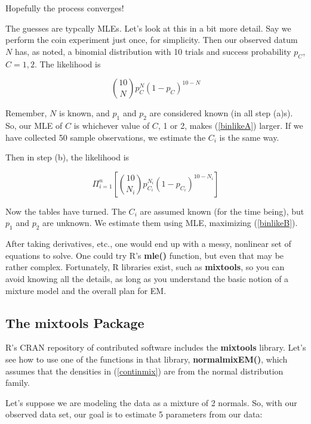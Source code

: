 Hopefully the process converges!

The guesses are typcally MLEs.  Let's look at this in a bit more detail.
Say we perform the coin experiment just once, for simplicity.  Then our
observed datum $N$ has, as noted, a binomial distribution with 10 trials
and success probability $p_C$, $C = 1,2$.  The likelihood is

\begin{equation}
\label{binlikeA}
\binom{10}{N} p_C^N (1-p_C)^{10-N}
\end{equation}

Remember, $N$ is known, and $p_1$ and $p_2$ are considered known (in all
step (a)s).  So, our MLE of $C$ is whichever value of $C$, 1 or 2, makes
(\ref{binlikeA}) larger.  If we have collected 50 sample observations, we
estimate the $C_i$ is the same way.

Then in step (b), the likelihood is

\begin{equation}
\label{binlikeB}
\Pi_{i=1}^n
\left [ \binom{10}{N_i} p_{C_i}^{N_i} (1-p_{C_i})^{10-N_i} 
\right ]
\end{equation}

Now the tables have turned.  The $C_i$ are assumed known (for the time
being), but $p_1$ and $p_2$ are unknown.  We estimate them using MLE,
maximizing (\ref{binlikeB}).

After taking derivatives, etc., one would end up with a messy, nonlinear
set of equations to solve.  One could try R's {\bf mle()} function, but
even that may be rather complex.  Fortunately, R libraries exist, such
as {\bf mixtools}, so you can avoid knowing all the details, as long as
you understand the basic notion of a mixture model and the overall plan
for EM.  

\subsection{The mixtools Package}

R's CRAN repository of contributed software includes the {\bf mixtools}
library.  Let's see how to use one of the functions in that library,
{\bf normalmixEM()}, which assumes that the densities in
(\ref{continmix}) are from the normal distribution family.

Let's suppose we are modeling the data as a mixture of 2 normals.
So, with our observed data set, our goal is to estimate 5 parameters
from our data:  

